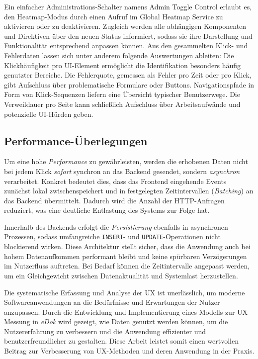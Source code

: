 \documentclass[12pt,oneside]{article}
\begin{document}
Ein einfacher Administrations-Schalter namens Admin Toggle Control erlaubt es, den Heatmap-Modus durch einen Aufruf im Global Heatmap Service zu aktivieren oder zu deaktivieren. Zugleich werden alle abhängigen Komponenten und Direktiven über den neuen Status informiert, sodass sie ihre Darstellung und Funktionalität entsprechend anpassen können.
Aus den gesammelten Klick- und Fehlerdaten lassen sich unter anderem folgende Auswertungen ableiten: Die Klickhäufigkeit pro UI-Element ermöglicht die Identifikation besonders häufig genutzter Bereiche. Die Fehlerquote, gemessen als Fehler pro Zeit oder pro Klick, gibt Aufschluss über problematische Formulare oder Buttons. Navigationspfade in Form von Klick-Sequenzen liefern eine Übersicht typischer Benutzerwege. Die Verweildauer pro Seite kann schließlich Aufschluss über Arbeitsaufwände und potenzielle UI-Hürden geben.

\subsection{Performance-Überlegungen}
Um eine hohe \emph{Performance} zu gewährleisten, werden die erhobenen Daten nicht bei jedem Klick \emph{sofort} synchron an das Backend gesendet, sondern \emph{asynchron} verarbeitet. Konkret bedeutet dies, dass das Frontend eingehende Events zunächst lokal zwischenspeichert und in festgelegten Zeitintervallen (\emph{Batching}) an das Backend übermittelt. Dadurch wird die Anzahl der HTTP-Anfragen reduziert, was eine deutliche Entlastung des Systems zur Folge hat.

Innerhalb des Backends erfolgt die \emph{Persistierung} ebenfalls in asynchronen Prozessen, sodass umfangreiche \texttt{INSERT}- und \texttt{UPDATE}-Operationen nicht blockierend wirken. Diese Architektur stellt sicher, dass die Anwendung auch bei hohem Datenaufkommen performant bleibt und keine spürbaren Verzögerungen im Nutzerfluss auftreten. Bei Bedarf können die Zeitintervalle angepasst werden, um ein Gleichgewicht zwischen Datenaktualität und Systemlast herzustellen.

 

Die systematische Erfassung und Analyse der UX ist unerlässlich, um moderne Softwareanwendungen an die Bedürfnisse und Erwartungen der Nutzer anzupassen. Durch die Entwicklung und Implementierung eines Modells zur UX-Messung in \textit{eDok} wird gezeigt, wie Daten genutzt werden können, um die Nutzererfahrung zu verbessern und die Anwendung effizienter und benutzerfreundlicher zu gestalten. Diese Arbeit leistet somit einen wertvollen Beitrag zur Verbesserung von UX-Methoden und deren Anwendung in der Praxis.
 
\end{document}
